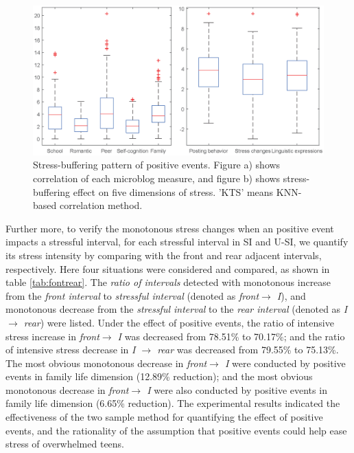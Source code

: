 \begin{figure}
\centering
\includegraphics[width=\linewidth]{figs/boxNew.eps}%
\caption{\small{Stress-buffering pattern of positive events. Figure a) shows correlation of each microblog measure,
and figure b) shows stress-buffering effect on five dimensions of stress. 'KTS' means KNN-based correlation method.}}
\label{fig:correlation}
\end{figure}


Further more,
to verify the monotonous stress changes when an positive event impacts a stressful interval,
for each stressful interval in SI and U-SI,
we quantify its stress intensity by comparing with the front and rear adjacent intervals, respectively.
Here four situations were considered and compared,
as shown in table \ref{tab:fontrear}.
The \emph{ratio of intervals} detected with monotonous increase from the \emph{front interval} to \emph{stressful interval} (denoted as \emph{front$ \rightarrow$ I}),
and monotonous decrease from the \emph{stressful interval} to the \emph{rear interval} (denoted as \emph{I $\rightarrow$ rear}) were listed.
Under the effect of positive events,
the ratio of intensive stress increase in \emph{front$ \rightarrow$ I} was decreased from 78.51\% to 70.17\%;
and the ratio of intensive stress decrease in \emph{I $\rightarrow$ rear} was decreased from 79.55\% to 75.13\%.
The most obvious monotonous decrease in \emph{front$ \rightarrow$ I} were conducted by positive events in family life dimension (12.89\% reduction);
and the most obvious monotonous decrease in \emph{front$ \rightarrow$ I} were also conducted by positive events in family life dimension (6.65\% reduction).
The experimental results indicated the effectiveness of the two sample method for quantifying the effect of positive events,
and the rationality of the assumption that positive events could help ease stress of overwhelmed teens.


